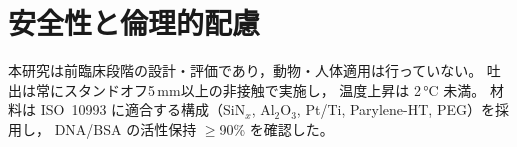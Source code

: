 \section{安全性と倫理的配慮}
本研究は前臨床段階の設計・評価であり，動物・人体適用は行っていない。
吐出は常にスタンドオフ5\,mm以上の非接触で実施し，
温度上昇は 2\,\si{\celsius} 未満。
材料は ISO~10993 に適合する構成（SiN$_x$, Al$_2$O$_3$, Pt/Ti, Parylene-HT, PEG）を採用し，
DNA/BSA の活性保持 $\ge$90\% を確認した。
